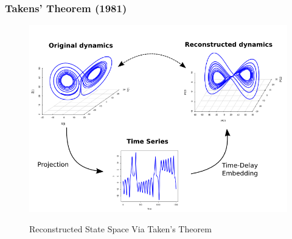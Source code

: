 \documentclass{beamer}
\theoremstyle{definition}
\begin{document}
\begin{frame}
\frametitle{Takens' Theorem (1981)}
\vspace{-0.8cm}
\begin{figure}
 \includegraphics[scale=.45]{takens_theorem_final} \\
\caption{Reconstructed State Space Via Taken's Theorem}
\end{figure} 
\end{frame}
\end{document}
